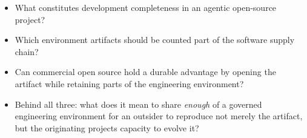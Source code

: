 \begin{itemize}
\tightlist
\item
  What constitutes development completeness in an agentic open-source project?
\item
  Which environment artifacts should be counted part of the software supply chain?
\item
  Can commercial open source hold a durable advantage by opening the artifact while retaining parts of the engineering environment?
\item
  Behind all three: what does it mean to share \emph{enough} of a governed engineering environment for an outsider to reproduce not merely the artifact, but the originating project\textquotesingle s capacity to evolve it?
\end{itemize}
